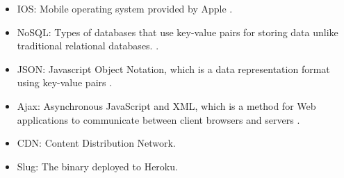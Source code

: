 \begin{itemize}
\item IOS: Mobile operating system provided by Apple \cite{IOS}.
\item NoSQL: Types of databases that use key-value pairs for storing data unlike traditional relational databases. \cite{NoSql}.
\item JSON: Javascript Object Notation, which is a data representation format using key-value pairs \cite{json}.
\item Ajax:  Asynchronous JavaScript and XML, which is a method for Web applications to communicate between client browsers and servers \cite{Ajax}.
\item CDN: Content Distribution Network.
\item Slug: The binary deployed to Heroku.
\end{itemize}


